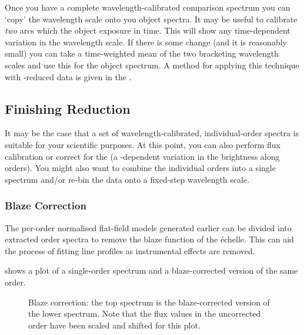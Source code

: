 Once you have a complete wavelength-calibrated comparison spectrum you
can `copy' the wavelength scale onto you object spectra.  It may be
useful to calibrate {\em two} arcs which 
the object exposure in
time.  This will show any time-dependent variation in the wavelength
scale.  If there is some change (and it is reasonably small) you can
take a time-weighted mean of the two bracketing wavelength scales and use
this for the object spectrum.  A method for applying this technique
with -reduced data is given in the
\@.


\subsection{\label{se_finishing}Finishing Reduction}

It may be the case that a set of wavelength-calibrated, individual-order
spectra is suitable for your scientific purposes.  At this point, you
can also perform flux calibration or correct for the
 (a
-dependent variation in the brightness along
orders).  You might also want to combine the individual orders into a single
spectrum and/or re-bin the data onto a fixed-step wavelength scale.

\subsubsection{Blaze Correction}

The per-order normalised flat-field models generated earlier can be
divided into extracted order spectra to remove the blaze function of the
\'{e}chelle.  This can aid the process of fitting line profiles as
instrumental effects are removed.

 shows a plot of a
single-order spectrum and a blaze-corrected version of the same order.

\begin{figure}
\begin{center}
{\leavevmode\epsfysize=136mm}

\parbox{140mm}{
\caption{Blaze correction: the top spectrum is the blaze-corrected version of
the lower spectrum.  Note that the flux values in the uncorrected order have
been scaled and shifted for this plot.}
\label{fi_blaze}
}
\end{center}
\end{figure}

